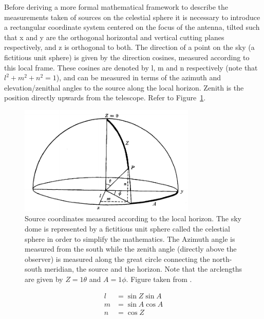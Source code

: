Before deriving a more formal mathematical framework to describe the measurements taken of sources on the celestial sphere it is necessary to introduce a 
rectangular coordinate system centered on the focus of the antenna, tilted such that x and y are the orthogonal horizontal and vertical cutting planes respectively, and z
is orthogonal to both. The direction of a point on the sky (a fictitious unit sphere) is given by the direction cosines, measured according to this local frame. These cosines are 
denoted by l, m and n respectively (note that $l^2 + m^2 + n^2 = 1$), and can be measured in terms of the azimuth and elevation/zenithal angles to the source along the local horizon.
Zenith is the position directly upwards from the telescope. Refer to Figure~\ref{fig_lmn}.
\begin{figure}[ht]
\begin{mdframed}
 \centering
 \includegraphics[width=0.75\textwidth]{images/lmn.png}
 \caption[lmn coordinates]{Source coordinates measured according to the local horizon. The sky dome is represented by a fictitious unit sphere called the celestial sphere in order to simplify 
 the mathematics. The Azimuth angle is measured from the south while the zenith angle (directly above the observer) is measured along the great circle connecting the north-south meridian, the source 
 and the horizon. Note that the arclengths are given by $Z=1\theta$ and $A=1\phi$. Figure taken from \cite{christiansenradiotelescopes}.}
 \label{fig_lmn}
\end{mdframed}
\end{figure}
\begin{equation*}
 \begin{split}
  l &= \sin{Z}\sin{A}\\
  m &= \sin{A}\cos{A}\\
  n &= \cos{Z}\\
 \end{split}
\end{equation*}

